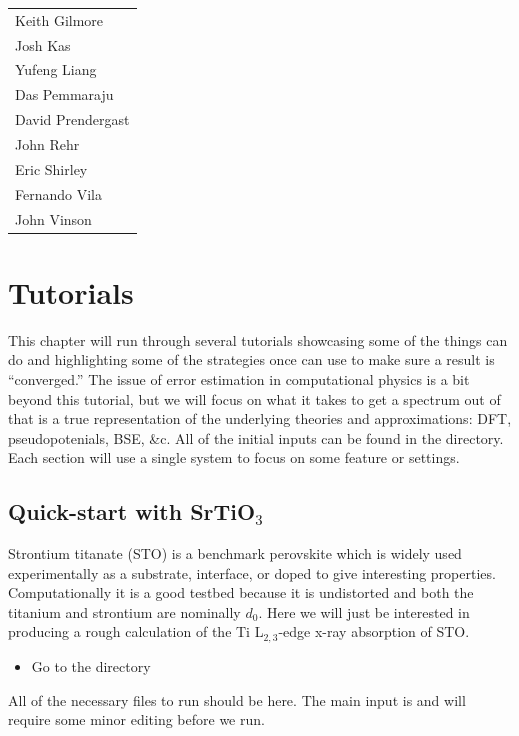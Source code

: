 \documentclass[11pt]{report}
\begin{document}
\begin{tabular}{l}
Keith Gilmore \\
Josh Kas \\
Yufeng Liang \\
Das Pemmaraju \\
David Prendergast \\
John Rehr \\
Eric Shirley \\
Fernando Vila \\
John Vinson \\
\end{tabular}

\chapter{Tutorials}

This chapter will run through several tutorials showcasing some of the things  can do and highlighting some of the strategies once can use to make sure a result is ``converged.'' The issue of error estimation in computational physics is a bit beyond this tutorial, but we will focus on what it takes to get a spectrum out of  that is a true representation of the underlying theories and approximations: DFT, pseudopotenials, BSE, \&c. All of the initial inputs can be found in the  directory. Each section will use a single system to focus on some feature or settings. 


\section{Quick-start with SrTiO$_3$}

Strontium titanate (STO) is a benchmark perovskite which is widely used experimentally as a substrate, interface, or doped to give interesting properties. 
Computationally it is a good testbed because it is undistorted and both the titanium and strontium are nominally $d_0$. Here we will just be interested in producing a rough calculation of the Ti L$_{2,3}$-edge x-ray absorption of STO.
\begin{itemize}
\item Go to the  directory
\end{itemize}
All of the necessary files to run should be here. The main input is  and will require some minor editing before we run. 
\end{document}
